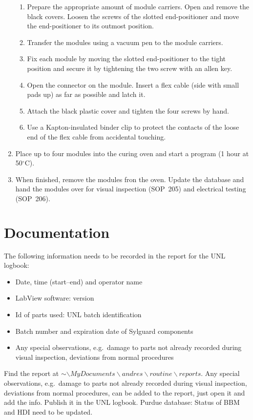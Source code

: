 \documentclass[12pt]{unlsilabsop}
\begin{document}
\begin{enumerate}
    \begin{enumerate}
        \item Prepare the appropriate amount of module carriers. Open and remove the black covers. Loosen the screws of the slotted end-positioner and move the end-positioner to its outmost position.
        \item Transfer the modules using a vacuum pen to the module carriers.
        \item Fix each module by moving the slotted end-positioner to the tight position and secure it by tightening the two screw with an allen key.
        \item Open the connector on the module. Insert a flex cable (side with small pads up) as far as possible and latch it.
        \item Attach the black plastic cover and tighten the four screws by hand.
        \item Use a Kapton-insulated binder clip to protect the contacts of the loose end of the flex cable from accidental touching.
    \end{enumerate}
    \item Place up to four modules into the curing oven and start a program (1 hour at 50$^\circ$C).
    \item When finished, remove the modules fron the oven. Update the database and hand the modules over for visual inspection (SOP~205) and electrical testing (SOP~206).
\end{enumerate}

\section{Documentation}
The following information needs to be recorded in the report for the UNL logbook:
\begin{itemize}
    \item Date, time (start--end) and operator name
    \item LabView software: version
    \item Id of parts used: UNL batch identification
    \item Batch number and expiration date of Sylguard components
    \item Any special observations, e.g.~damage to parts not already recorded during visual inspection, deviations from normal procedures
\end{itemize}

Find the report at $\sim\backslash MyDocuments\backslash andres\backslash routine\backslash reports$. Any special observations, e.g.~damage to parts not already recorded during visual inspection, deviations from normal procedures, can be added to the report, just open it and add the info. Publish it in the UNL logbook. 
Purdue database: Status of BBM and HDI need to be updated.
\end{document}
